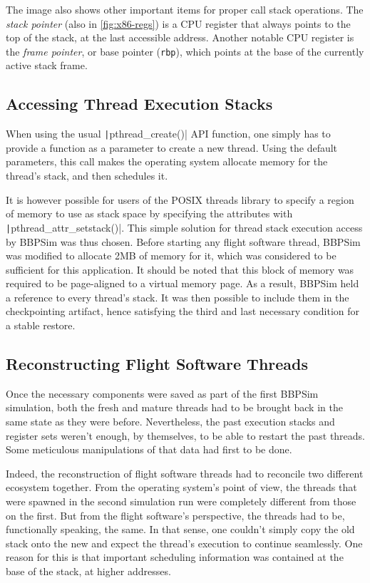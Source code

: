 The image also shows other important items for proper call stack operations. The \textit{stack pointer} (also in \autoref{fig:x86-regs}) is a CPU register that always points to the top of the stack, at the last accessible address. Another notable CPU register is the \textit{frame pointer}, or base pointer (\texttt{rbp}), which points at the base of the currently active stack frame. 

\subsection*{Accessing Thread Execution Stacks}
When using the usual \texttt|pthread_create()| API function, one simply has to provide a function as a parameter to create a new thread. Using the default parameters, this call makes the operating system allocate memory for the thread's stack, and then schedules it\cite{online:pthread-create}.

It is however possible for users of the POSIX threads library to specify a region of memory to use as stack space by specifying the attributes with \texttt|pthread_attr_setstack()|. This simple solution for thread stack execution access by BBPSim was thus chosen. Before starting any flight software thread, \gls{BBPSim} was modified to allocate 2MB of memory for it, which was considered to be sufficient for this application. It should be noted that this block of memory was required to be page-aligned to a virtual memory page. As a result, BBPSim held a reference to every thread's stack. It was then possible to include them in the checkpointing artifact, hence satisfying the third and last necessary condition for a stable restore.

\subsection*{Reconstructing Flight Software Threads}
Once the necessary components were saved as part of the first BBPSim simulation, both the fresh and mature threads had to be brought back in the same state as they were before. Nevertheless, the past execution stacks and register sets weren't enough, by themselves, to be able to restart the past threads. Some meticulous manipulations of that data had first to be done. 

Indeed, the reconstruction of flight software threads had to reconcile two different ecosystem together. From the operating system's point of view, the threads that were spawned in the second simulation run were completely different from those on the first. But from the flight software's perspective, the threads had to be, functionally speaking, the same. In that sense, one couldn't simply copy the old stack onto the new and expect the thread's execution to continue seamlessly. One reason for this is that important scheduling information was contained at the base of the stack, at higher addresses. 

